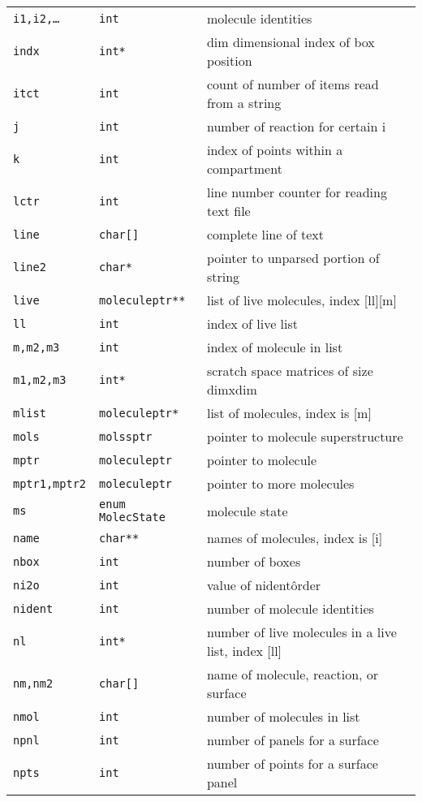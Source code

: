 \documentclass {scrbook}
\newcommand {\ttt} {\texttt}
\begin{document}
\begin{longtable}[c]{lll}
\ttt{i1,i2,\ldots} & \ttt{int} & molecule identities\\
\ttt{indx} & \ttt{int*} & dim dimensional index of box position\\
\ttt{itct} & \ttt{int} & count of number of items read from a string\\
\ttt{j} & \ttt{int} & number of reaction for certain i\\
\ttt{k} & \ttt{int} & index of points within a compartment\\
\ttt{lctr} & \ttt{int} & line number counter for reading text file\\
\ttt{line} & \ttt{char[]} & complete line of text\\
\ttt{line2} & \ttt{char*} & pointer to unparsed portion of string\\
\ttt{live} & \ttt{moleculeptr**} & list of live molecules, index [ll][m]\\
\ttt{ll} & \ttt{int} & index of live list\\
\ttt{m,m2,m3} & \ttt{int} & index of molecule in list\\
\ttt{m1,m2,m3} & \ttt{int*} & scratch space matrices of size dimxdim\\
\ttt{mlist} & \ttt{moleculeptr*} & list of molecules, index is [m]\\
\ttt{mols} & \ttt{molssptr} & pointer to molecule superstructure\\
\ttt{mptr} & \ttt{moleculeptr} & pointer to molecule\\
\ttt{mptr1,mptr2} & \ttt{moleculeptr} & pointer to more molecules\\
\ttt{ms} & \ttt{enum MolecState} & molecule state\\
\ttt{name} & \ttt{char**} & names of molecules, index is [i]\\
\ttt{nbox} & \ttt{int} & number of boxes\\
\ttt{ni2o} & \ttt{int} & value of nident\^order\\
\ttt{nident} & \ttt{int} & number of molecule identities\\
\ttt{nl} & \ttt{int*} & number of live molecules in a live list, index [ll]\\
\ttt{nm,nm2} & \ttt{char[]} & name of molecule, reaction, or surface\\
\ttt{nmol} & \ttt{int} & number of molecules in list\\
\ttt{npnl} & \ttt{int} & number of panels for a surface\\
\ttt{npts} & \ttt{int} & number of points for a surface panel\\

\end{longtable}
\end{document}
